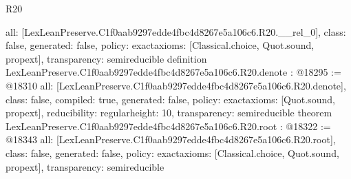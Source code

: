 \begin{lexlean}{R20}
\begin{coremodule}
{  all: [LexLeanPreserve.C1f0aab9297edde4fbc4d8267e5a106c6.R20.__rel_0],
  class: false,
  generated: false,
  policy: exact{axioms: [Classical.choice, Quot.sound, propext]},
  transparency: semireducible
}
definition LexLeanPreserve.C1f0aab9297edde4fbc4d8267e5a106c6.R20.denote : @18295 := @18310 {
  all: [LexLeanPreserve.C1f0aab9297edde4fbc4d8267e5a106c6.R20.denote],
  class: false,
  compiled: true,
  generated: false,
  policy: exact{axioms: [Quot.sound, propext]},
  reducibility: regular{height: 10},
  transparency: semireducible
}
theorem LexLeanPreserve.C1f0aab9297edde4fbc4d8267e5a106c6.R20.root : @18322 := @18343 {
  all: [LexLeanPreserve.C1f0aab9297edde4fbc4d8267e5a106c6.R20.root],
  class: false,
  generated: false,
  policy: exact{axioms: [Classical.choice, Quot.sound, propext]},
  transparency: semireducible
}


\end{coremodule}
\end{lexlean}
